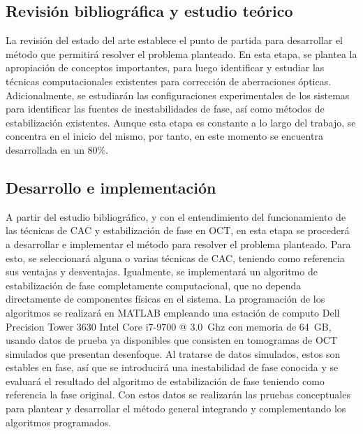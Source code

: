 \documentclass[letter, 12 pt]{article}
\begin{document}
	\subsection{Revisión bibliográfica y estudio teórico}
La revisión del estado del arte establece el punto de partida para desarrollar el método que permitirá resolver el problema planteado. En esta etapa, se plantea la apropiación de conceptos importantes, para luego identificar y estudiar las técnicas computacionales existentes para corrección de aberraciones ópticas. Adicionalmente, se estudiarán las configuraciones experimentales de los sistemas para identificar las fuentes de inestabilidades de fase, así como métodos de estabilización existentes. Aunque esta etapa es constante a lo largo del trabajo, se concentra en el inicio del mismo, por tanto, en este momento se encuentra desarrollada en un 80\%. %

	\subsection{Desarrollo e implementación}
A partir del estudio bibliográfico, y con el entendimiento del funcionamiento de las técnicas de CAC y estabilización de fase en OCT, en esta etapa se procederá a desarrollar e implementar el método para resolver el problema planteado. Para esto, se seleccionará alguna o varias técnicas de CAC, teniendo como referencia sus ventajas y desventajas. Igualmente, se implementará un algoritmo de estabilización de fase completamente computacional, que no dependa directamente de componentes físicas en el sistema. La programación de los algoritmos se realizará en MATLAB empleando una estación de computo Dell Precision Tower 3630 Intel Core i7-9700 @ 3.0~Ghz con memoria de 64~GB, usando datos de prueba ya disponibles que consisten en tomogramas de OCT simulados que presentan desenfoque. Al tratarse de datos simulados, estos son estables en fase, así que se introducirá una inestabilidad de fase conocida y se evaluará el resultado del algoritmo de estabilización de fase teniendo como referencia la fase original. Con estos datos se realizarán las pruebas conceptuales para plantear y desarrollar el método general integrando y complementando los algoritmos programados.
\end{document}

